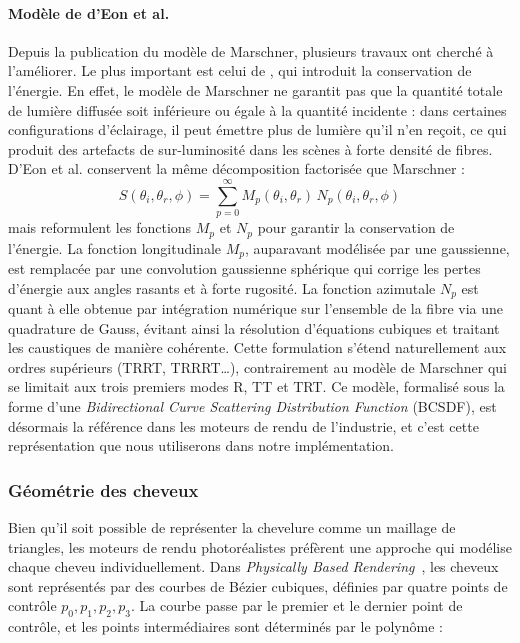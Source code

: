 \paragraph{Modèle de d'Eon et al.}
Depuis la publication du modèle de Marschner, plusieurs travaux ont cherché à l'améliorer. Le plus important est celui de \textcite{deon2011egsr}, qui introduit la conservation de l'énergie. En effet, le modèle de Marschner ne garantit pas que la quantité totale de lumière diffusée soit inférieure ou égale à la quantité incidente : dans certaines configurations d'éclairage, il peut émettre plus de lumière qu'il n'en reçoit, ce qui produit des artefacts de sur-luminosité dans les scènes à forte densité de fibres. D'Eon et al. conservent la même décomposition factorisée que Marschner :
\begin{equation}
    S(\theta_i, \theta_r, \phi) = \sum_{p=0}^{\infty} M_p(\theta_i, \theta_r)\, N_p(\theta_i, \theta_r, \phi)
\end{equation}
mais reformulent les fonctions $M_p$ et $N_p$ pour garantir la conservation de l'énergie. La fonction longitudinale $M_p$, auparavant modélisée par une gaussienne, est remplacée par une convolution gaussienne sphérique qui corrige les pertes d'énergie aux angles rasants et à forte rugosité. La fonction azimutale $N_p$ est quant à elle obtenue par intégration numérique sur l'ensemble de la fibre via une quadrature de Gauss, évitant ainsi la résolution d'équations cubiques et traitant les caustiques de manière cohérente. Cette formulation s'étend naturellement aux ordres supérieurs (TRRT, TRRRT\ldots), contrairement au modèle de Marschner qui se limitait aux trois premiers modes R, TT et TRT. 
Ce modèle, formalisé sous la forme d'une \textit{Bidirectional Curve Scattering Distribution Function} (BCSDF), est désormais la référence dans les moteurs de rendu de l'industrie, et c'est cette représentation que nous utiliserons dans notre implémentation.

\subsubsection{Géométrie des cheveux}
\label{sec:geometrie-cheveux}

Bien qu'il soit possible de représenter la chevelure comme un maillage de triangles, les moteurs de rendu photoréalistes préfèrent une approche qui modélise chaque cheveu individuellement. Dans \textit{Physically Based Rendering}~\autocite{pbrt4}, les cheveux sont représentés par des courbes de Bézier cubiques, définies par quatre points de contrôle $p_0, p_1, p_2, p_3$. La courbe passe par le premier et le dernier point de contrôle, et les points intermédiaires sont déterminés par le polynôme :

